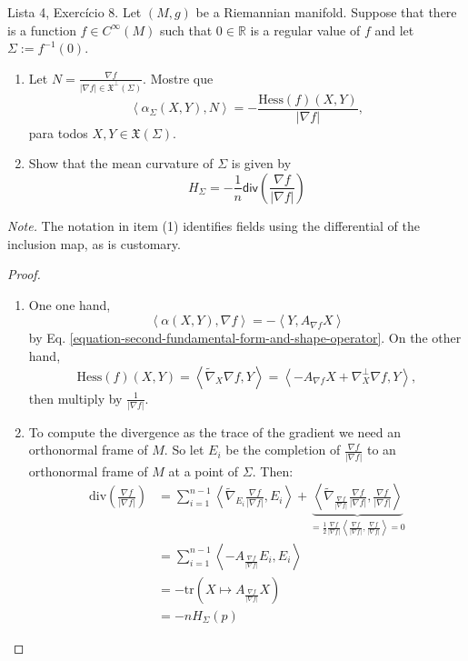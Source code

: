 \begin{exercise}
\label{exercise-mean-curvature}
Lista 4, Exercício 8. Let $(M,g)$ be a Riemannian manifold. Suppose that there
is a function $f \in C^\infty(M)$ such that $0 \in \mathbb{R}$ is a regular
value of $f$ and let $\Sigma:=f^{-1}(0)$.
\begin{enumerate}
\item Let $N=\frac{\nabla f}{|\nabla f| \in \mathfrak{X}^\perp(\Sigma)}$. Mostre
que
$$
\left<\alpha_{\Sigma}(X,Y),N\right>=-\frac{\text{Hess}(f)(X,Y)}{|\nabla f|},
$$
para todos $X,Y \in \mathfrak{X}(\Sigma)$.

\item Show that the mean curvature of $\Sigma$ is given by
$$
H_{\Sigma}=-\frac{1}{n}\mathsf{div}\left(\frac{\nabla f}{|\nabla f|}\right)
$$
\end{enumerate}
{\it Note.} The notation in item (1) identifies fields using the differential of
the inclusion map, as is customary.
\end{exercise}

\begin{proof}
\begin{enumerate}
\item One one hand,
 $$
\left<\alpha(X,Y),\nabla f\right>=-\left<Y,A_{\nabla f}X\right>
$$
by Eq. \ref{equation-second-fundamental-form-and-shape-operator}.
On the other hand,
$$
\text{Hess}(f)(X,Y)=\left<\tilde{\nabla}_X \nabla f,Y\right>=
\left<-A_{\nabla f}X+\nabla_X^\perp \nabla f,Y\right>,
$$
then multiply by $\frac{1}{|\nabla f|}$.

\item To compute the divergence as the trace of the gradient we need an
orthonormal frame of $M$. So let $E_i$ be the completion of 
$\frac{\nabla f}{|\nabla f|}$ to an orthonormal frame of $M$ at a point of
$\Sigma$. Then:
\begin{equation}
\begin{aligned}
\text{div}\left(\frac{\nabla f}{|\nabla f|}\right)
&=\sum_{i=1}^{n-1}
\left<\tilde{\nabla}_{E_i}\frac{\nabla f}{|\nabla f|},E_i\right>
+\underbrace{\left<\tilde{\nabla}_{\frac{\nabla f}{|\nabla f|}}
\frac{\nabla f}{|\nabla f|},\frac{\nabla f}{|\nabla f|}\right>}
_{=\frac{1}{2}\frac{\nabla f}{|\nabla f|}
\left<\frac{\nabla f}{|\nabla f|},\frac{\nabla f}{|\nabla f|}\right>=0}
\label{equation-divergence-of-normalized-gradient}\\
&=\sum_{i=1}^{n-1} \left<-A_{\frac{\nabla f}{|\nabla f|}}E_i,E_i\right>\\
&=-\text{tr}\left(X \mapsto A_{\frac{\nabla f}{|\nabla f|}}X\right)\\
&=-nH_{\Sigma}(p)
\end{aligned}
\end{equation}
\end{enumerate}
\end{proof}

